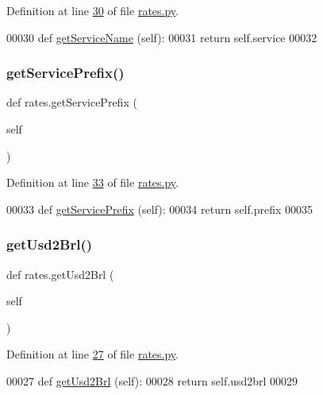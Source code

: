 Definition at line \hyperlink{rates_8py_source_l00030}{30} of file \hyperlink{rates_8py_source}{rates.\+py}.


\begin{DoxyCode}
00030     \textcolor{keyword}{def }\hyperlink{namespacerates_a5dd7b6601bc66e313c26984e32f1e290}{getServiceName} (self):
00031         \textcolor{keywordflow}{return} self.service
00032     
\end{DoxyCode}
\mbox{\label{namespacerates_aafc179b32863137b88c74dd0ee2576bd}} 
\subsubsection{\texorpdfstring{get\+Service\+Prefix()}{getServicePrefix()}}
{\footnotesize\ttfamily def rates.\+get\+Service\+Prefix (\begin{DoxyParamCaption}\item[{}]{self }\end{DoxyParamCaption})}



Definition at line \hyperlink{rates_8py_source_l00033}{33} of file \hyperlink{rates_8py_source}{rates.\+py}.


\begin{DoxyCode}
00033     \textcolor{keyword}{def }\hyperlink{namespacerates_aafc179b32863137b88c74dd0ee2576bd}{getServicePrefix} (self):
00034         \textcolor{keywordflow}{return} self.prefix
00035         
\end{DoxyCode}
\mbox{\label{namespacerates_ae4c7203ef8a919f9cf522581ca00b08a}} 
\subsubsection{\texorpdfstring{get\+Usd2\+Brl()}{getUsd2Brl()}}
{\footnotesize\ttfamily def rates.\+get\+Usd2\+Brl (\begin{DoxyParamCaption}\item[{}]{self }\end{DoxyParamCaption})}



Definition at line \hyperlink{rates_8py_source_l00027}{27} of file \hyperlink{rates_8py_source}{rates.\+py}.


\begin{DoxyCode}
00027     \textcolor{keyword}{def }\hyperlink{namespacerates_ae4c7203ef8a919f9cf522581ca00b08a}{getUsd2Brl} (self):
00028         \textcolor{keywordflow}{return} self.usd2brl
00029     
\end{DoxyCode}
